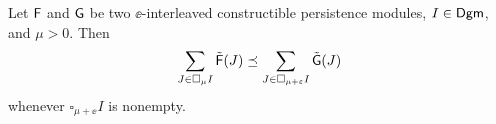 \documentclass[12pt]{article}
\begin{document}


\begin{lem}
\label{lem:box}
Let ${\mathsf{F}}$ and ${\mathsf{G}}$ be two $\ee$-interleaved constructible persistence modules, $I \in {\mathsf{Dgm}}$, 
and $\mu > 0$.
Then 
$$\sum_{J \in \square_{\mu} I} \tilde {{\mathsf{F}}}(J) \preceq \sum_{J \in \square_{\mu + \varepsilon} I} \tilde {{\mathsf{G}}}(J)$$
whenever $\square_{\mu + \ee} I$ is nonempty.
\end{lem}
\end{document}
